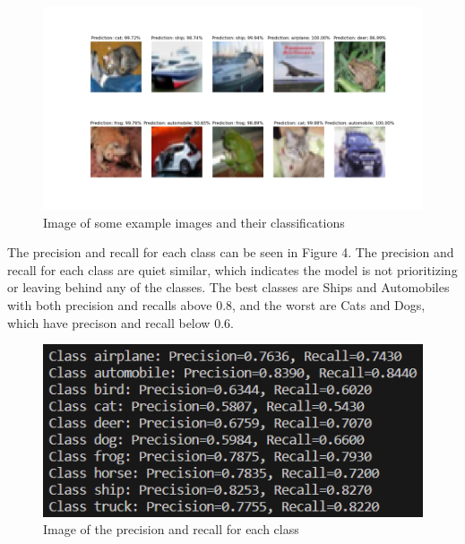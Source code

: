 \documentclass[letterpaper, 12pt]{article}
\begin{document}
\begin{figure}[H]
\centering
\includegraphics[scale = 0.5]{example_predictions}
\caption{Image of some example images and their classifications}
\end{figure}

The precision and recall  for each class can be seen in Figure 4. The precision and recall for each class are quiet similar, which indicates the model is not prioritizing or leaving behind any of the classes. The best classes are Ships and Automobiles with both precision and recalls above 0.8, and the worst are Cats and Dogs, which have precison and recall below 0.6.

\begin{figure}[H]
\centering
\includegraphics[scale = 0.8]{precision_and_recall}
\caption{Image of the precision and recall for each class}
\end{figure}
\end{document}
